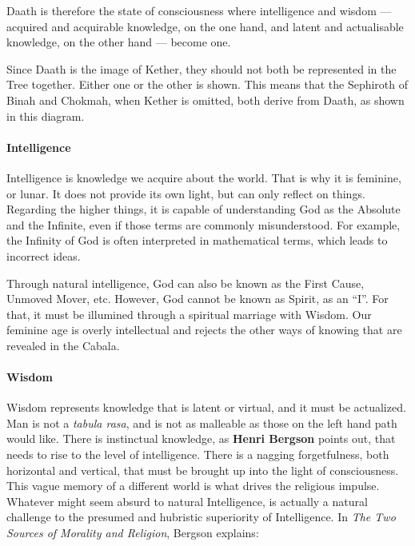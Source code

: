 \begin{quotex}
Daath is therefore the state of consciousness where intelligence and wisdom --- acquired and acquirable knowledge, on the one hand, and latent and actualisable knowledge, on the other hand --- become one.
\end{quotex}

Since Daath is the image of Kether, they should not both be represented in the Tree together. Either one or the other is shown. This means that the Sephiroth of Binah and Chokmah, when Kether is omitted, both derive from Daath, as shown in this diagram.

\paragraph{Intelligence}


Intelligence is knowledge we acquire about the world. That is why it is feminine, or lunar. It does not provide its own light, but can only reflect on things. Regarding the higher things, it is capable of understanding God as the Absolute and the Infinite, even if those terms are commonly misunderstood. For example, the Infinity of God is often interpreted in mathematical terms, which leads to incorrect ideas.

Through natural intelligence, God can also be known as the First Cause, Unmoved Mover, etc. However, God cannot be known as Spirit, as an ``I''. For that, it must be illumined through a spiritual marriage with Wisdom. Our feminine age is overly intellectual and rejects the other ways of knowing that are revealed in the Cabala.

\paragraph{Wisdom}


Wisdom represents knowledge that is latent or virtual, and it must be actualized. Man is not a \emph{tabula rasa}, and is not as malleable as those on the left hand path would like. There is instinctual knowledge, as \textbf{Henri Bergson} points out, that needs to rise to the level of intelligence. There is a nagging forgetfulness, both horizontal and vertical, that must be brought up into the light of consciousness. This vague memory of a different world is what drives the religious impulse. Whatever might seem absurd to natural Intelligence, is actually a natural challenge to the presumed and hubristic superiority of Intelligence. In \emph{The Two Sources of Morality and Religion}, Bergson explains:

